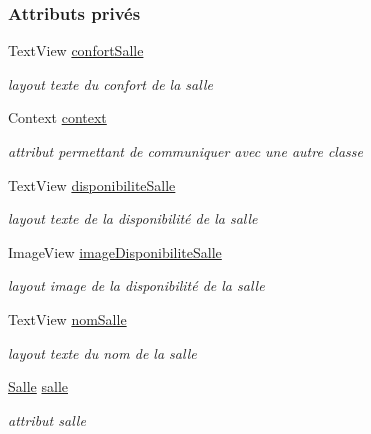 \subsubsection*{Attributs privés}
\begin{DoxyCompactItemize}
\item 
Text\+View \hyperlink{classcom_1_1lasalle_1_1meeting_1_1_salle_view_holder_adb1ed56224bf4c72f3b6ceadd1e20da5}{confort\+Salle}
\begin{DoxyCompactList}\small\item\em layout texte du confort de la salle \end{DoxyCompactList}\item 
Context \hyperlink{classcom_1_1lasalle_1_1meeting_1_1_salle_view_holder_a7072e3d124129f260af7a24c7ad4277d}{context}
\begin{DoxyCompactList}\small\item\em attribut permettant de communiquer avec une autre classe \end{DoxyCompactList}\item 
Text\+View \hyperlink{classcom_1_1lasalle_1_1meeting_1_1_salle_view_holder_a022ce4875ad260fe538779ae45fae90a}{disponibilite\+Salle}
\begin{DoxyCompactList}\small\item\em layout texte de la disponibilité de la salle \end{DoxyCompactList}\item 
Image\+View \hyperlink{classcom_1_1lasalle_1_1meeting_1_1_salle_view_holder_aa062c074e992faadf2386744ea33034f}{image\+Disponibilite\+Salle}
\begin{DoxyCompactList}\small\item\em layout image de la disponibilité de la salle \end{DoxyCompactList}\item 
Text\+View \hyperlink{classcom_1_1lasalle_1_1meeting_1_1_salle_view_holder_a54d26a89113e63e36c17c4ed9253f058}{nom\+Salle}
\begin{DoxyCompactList}\small\item\em layout texte du nom de la salle \end{DoxyCompactList}\item 
\hyperlink{classcom_1_1lasalle_1_1meeting_1_1_salle}{Salle} \hyperlink{classcom_1_1lasalle_1_1meeting_1_1_salle_view_holder_afe85265c9d35c5035e96ace9c8032606}{salle}
\begin{DoxyCompactList}\small\item\em attribut salle \end{DoxyCompactList}\end{DoxyCompactItemize}
